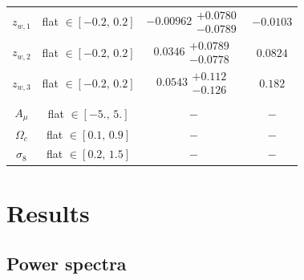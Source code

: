 \documentclass[a4paper,11pt]{article}
\begin{document}
\begin{table}
\begin{center}
\begin{tabular}{cccc}
          $z_{w, 1}$ & flat $\in [-0.2, \,0.2]$ & $-0.00962\substack{+0.0780 \\ -0.0789}$ & $-0.0103$ \\
          $z_{w, 2}$ & flat $\in [-0.2, \,0.2]$ & $0.0346\substack{+0.0789 \\ -0.0778}$ & $0.0824$ \\
          $z_{w, 3}$ & flat $\in [-0.2, \,0.2]$ & $0.0543\substack{+0.112 \\ -0.126}$ & $0.182$ \\ \\
          $A_{\mu}$ & flat $\in [-5., \,5.]$ & $ - $ & $ - $ \\
          $\Omega_{c}$ & flat $\in [0.1, \,0.9]$ & $ - $ & $ - $ \\
          $\sigma_{8}$ & flat $\in [0.2, \,1.5]$ & $ - $ & $ - $ \\
          \hline\hline 
        \end{tabular}
      \end{center}
    \end{table} 

\section{Results}\label{sec:results}
  \subsection{Power spectra}\label{ssec:results.spectra}
\end{document}
